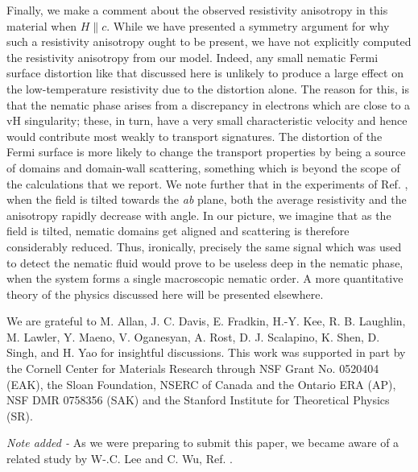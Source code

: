\documentclass[prb,aps,amssymb,showpacs,twocolumn,amsmath,floatfix]{revtex4}
\begin{document}
Finally, we make a comment about the observed resistivity anisotropy in this material when $H \parallel c$.  While we have presented a symmetry argument for why such a resistivity anisotropy ought to be 
present, we have not explicitly computed the resistivity anisotropy from our model.  
Indeed, any small nematic Fermi surface distortion like that discussed here is unlikely to produce a large effect on the low-temperature resistivity due to the distortion alone. 
The reason for this, is that the nematic phase arises from a discrepancy in 
electrons which are close to a vH singularity; these, in turn, have a very small 
characteristic velocity and hence would contribute most weakly to transport 
signatures.    The distortion of the Fermi surface is more likely to change the transport properties by being a source of domains and domain-wall scattering, something which is beyond the scope of the calculations that we report.
We note further that in the experiments of Ref. \cite{Borzi2007}, 
when the field is tilted towards the {\it ab} plane, both the average resistivity and the anisotropy rapidly 
decrease with angle.  In our picture, we imagine that as the field is tilted, nematic domains get aligned 
and scattering is therefore considerably reduced.   Thus, ironically, precisely the same signal which 
was used to detect the nematic fluid would prove to be useless deep in the nematic phase, when 
the system forms a single macroscopic nematic order.  A more quantitative theory of the physics 
discussed here will be presented elsewhere.  

\begin{acknowledgments}
We are grateful to M. Allan, J. C. Davis, E. Fradkin,  H.-Y. Kee, R. B. Laughlin,  M. Lawler,  Y. Maeno, V. Oganesyan, A. Rost, D. J. Scalapino,  K. Shen, D. Singh, and H. Yao for insightful discussions.  
This work was supported in part by the Cornell Center for Materials Research through NSF Grant No. 0520404 (EAK), the Sloan Foundation, NSERC of Canada and the Ontario ERA (AP), NSF DMR  0758356 (SAK) and the Stanford Institute for Theoretical Physics (SR).   

\end{acknowledgments} 

{\it Note added - } As we were preparing to submit this paper, we became aware of a related study by 
W-.C. Lee and C. Wu, Ref. \cite{Lee2009}.  

\appendix*
\end{document}
